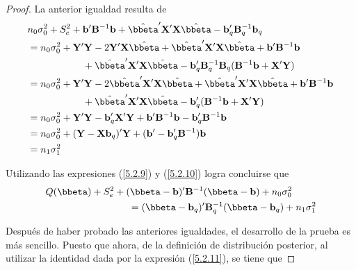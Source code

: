 \begin{proof}
La anterior igualdad resulta de
\begin{align*}
&n_0\sigma_0^2+S^2_e+\mathbf{b}'\mathbf{B}^{-1}\mathbf{b}+\hat{\bbeta}'\mathbf{X}'\mathbf{X}\hat{\bbeta}
-\mathbf{b}'_q\mathbf{B}_q^{-1}\mathbf{b}_q\\
&=n_0\sigma_0^2+\mathbf{Y}'\mathbf{Y}-2\mathbf{Y}'\mathbf{X}\hat{\bbeta}+\hat{\bbeta}'\mathbf{X}'\mathbf{X}\hat{\bbeta}
+\mathbf{b}'\mathbf{B}^{-1}\mathbf{b}\\
&\hspace{2cm}
+\hat{\bbeta}'\mathbf{X}'\mathbf{X}\hat{\bbeta}
-\mathbf{b}'_q\mathbf{B}_q^{-1}\mathbf{B}_q(\mathbf{B}^{-1}\mathbf{b}+\mathbf{X}'\mathbf{Y})\\
&=n_0\sigma_0^2+\mathbf{Y}'\mathbf{Y}-2\hat{\bbeta}'\mathbf{X}'\mathbf{X}\hat{\bbeta}
+\hat{\bbeta}'\mathbf{X}'\mathbf{X}\hat{\bbeta}
+\mathbf{b}'\mathbf{B}^{-1}\mathbf{b}\\
&\hspace{2cm}
+\hat{\bbeta}'\mathbf{X}'\mathbf{X}\hat{\bbeta}
-\mathbf{b}'_q(\mathbf{B}^{-1}\mathbf{b}+\mathbf{X}'\mathbf{Y})\\
&=n_0\sigma_0^2+\mathbf{Y}'\mathbf{Y}-\mathbf{b}'_q\mathbf{X}'\mathbf{Y}+\mathbf{b}'\mathbf{B}^{-1}\mathbf{b}
-\mathbf{b}'_q\mathbf{B}^{-1}\mathbf{b}\\
&=n_0\sigma_0^2+(\mathbf{Y}-\mathbf{X}\mathbf{b}_q)'\mathbf{Y}+(\mathbf{b}'-\mathbf{b}_q'\mathbf{B}^{-1})\mathbf{b}\\
&=n_1\sigma_1^2
\end{align*}

Utilizando las expresiones (\ref{5.2.9}) y (\ref{5.2.10}) logra concluirse que
\begin{align}\label{5.2.11}
&Q(\bbeta)+S^2_e+(\bbeta-\mathbf{b})'\mathbf{B}^{-1}(\bbeta-\mathbf{b})+n_0\sigma^2_0\notag\\
&\hspace{3cm}
=(\bbeta-\mathbf{b}_q)'\mathbf{B}^{-1}_q(\bbeta-\mathbf{b}_q)+n_1\sigma_1^2
\end{align}

Después de haber probado las anteriores igualdades, el desarrollo de la prueba es más sencillo. Puesto que ahora, de la definición de distribución posterior, al utilizar la identidad dada por la expresión (\ref{5.2.11}), se tiene que


\end{proof}
